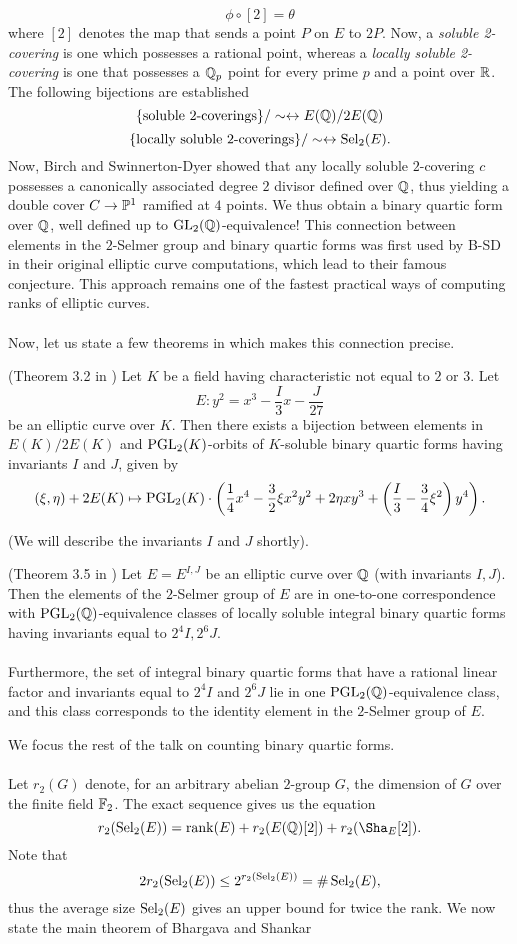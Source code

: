 \documentclass[12pt,amsfont]{amsart}
\begin{document}
\[\phi \circ [2] = \theta\]
where $[2]$ denotes the map that sends a point $P$ on $E$ to $2P$. Now, a \emph{soluble 2-covering} is one which possesses a rational point, whereas a \emph{locally soluble 2-covering} is one that possesses a ${\mathbb Q}_p$ point for every prime $p$ and a point over ${\mathbb R}$. The following bijections are established
\[\{\text{soluble } 2 \text{-coverings} \}/\sim \leftrightarrow E({\mathbb Q})/2E({\mathbb Q}) \]
\[\{\text{locally soluble } 2 \text{-coverings} \} / \sim \leftrightarrow \operatorname{Sel}_2(E).\]
Now, Birch and Swinnerton-Dyer showed that any locally soluble $2$-covering $c$ possesses a canonically associated degree $2$ divisor defined over ${\mathbb Q}$, thus yielding a double cover $C \rightarrow \mathbb{P}^1$ ramified at $4$ points. We thus obtain a binary quartic form over ${\mathbb Q}$, well defined up to $\operatorname{GL}_2({\mathbb Q})$-equivalence! This connection between elements in the $2$-Selmer group and binary quartic forms was first used by B-SD in their original elliptic curve computations, which lead to their famous conjecture. This approach remains one of the fastest practical ways of computing ranks of elliptic curves. \\ \\
Now, let us state a few theorems in \cite{BS1} which makes this connection precise.
\begin{theorem} (Theorem 3.2 in \cite{BS1}) Let $K$ be a field having characteristic not equal to $2$ or $3$. Let 
\[E : y^2 = x^3 - \frac{I}{3} x - \frac{J}{27}\]
be an elliptic curve over $K$. Then there exists a bijection between elements in $E(K)/2E(K)$ and $\operatorname{PGL}_2(K)$-orbits of $K$-soluble binary quartic forms having invariants $I$ and $J$, given by
\[(\xi, \eta) + 2 E(K) \mapsto \operatorname{PGL}_2(K) \cdot \left(\frac{1}{4} x^4 - \frac{3}{2} \xi x^2 y^2 + 2 \eta xy^3 + \left(\frac{I}{3} - \frac{3}{4} \xi^2\right) y^4 \right).\]
\end{theorem}
(We will describe the invariants $I$ and $J$ shortly). 
\begin{theorem} (Theorem 3.5 in \cite{BS1}) Let $E = E^{I,J}$ be an elliptic curve over ${\mathbb Q}$ (with invariants $I,J$). Then the elements of the $2$-Selmer group of $E$ are in one-to-one correspondence with $\operatorname{PGL}_2({\mathbb Q})$-equivalence classes of locally soluble integral binary quartic forms having invariants equal to $2^4 I, 2^6 J$. \\ \\
Furthermore, the set of integral binary quartic forms that have a rational linear factor and invariants equal to $2^4 I$ and $2^6 J$ lie in one $\operatorname{PGL}_2({\mathbb Q})$-equivalence class, and this class corresponds to the identity element in the $2$-Selmer group of $E$. 
\end{theorem}
We focus the rest of the talk on counting binary quartic forms. \\ \\
Let $r_2(G)$ denote, for an arbitrary abelian $2$-group $G$, the dimension of $G$ over the finite field ${\mathbb F}_2$. The exact sequence gives us the equation
\[r_2(\Sel_2(E)) = \rank(E) + r_2(E(\bQ)[2]) + r_2(\Sha_E[2]).\]
Note that
\[2r_2(\operatorname{Sel}_2(E)) \leq 2^{r_2(\operatorname{Sel}_2(E))} = \# \operatorname{Sel}_2(E),\]
thus the average size $\operatorname{Sel}_2(E)$ gives an upper bound for twice the rank. We now state the main theorem of Bhargava and Shankar
\end{document}
